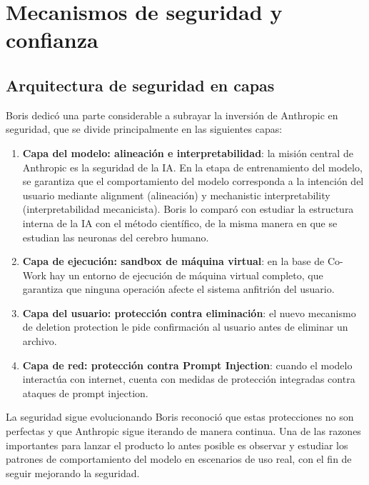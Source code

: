 \section{Mecanismos de seguridad y confianza}

\subsection{Arquitectura de seguridad en capas}

Boris dedicó una parte considerable a subrayar la inversión de Anthropic en seguridad, que se divide principalmente en las siguientes capas:

\begin{enumerate}
    \item \textbf{Capa del modelo: alineación e interpretabilidad}: la misión central de Anthropic es la seguridad de la IA. En la etapa de entrenamiento del modelo, se garantiza que el comportamiento del modelo corresponda a la intención del usuario mediante alignment (alineación) y mechanistic interpretability (interpretabilidad mecanicista). Boris lo comparó con estudiar la estructura interna de la IA con el método científico, de la misma manera en que se estudian las neuronas del cerebro humano.

    \item \textbf{Capa de ejecución: sandbox de máquina virtual}: en la base de Co-Work hay un entorno de ejecución de máquina virtual completo, que garantiza que ninguna operación afecte el sistema anfitrión del usuario.

    \item \textbf{Capa del usuario: protección contra eliminación}: el nuevo mecanismo de deletion protection le pide confirmación al usuario antes de eliminar un archivo.

    \item \textbf{Capa de red: protección contra Prompt Injection}: cuando el modelo interactúa con internet, cuenta con medidas de protección integradas contra ataques de prompt injection.
\end{enumerate}

\begin{warningbox}{La seguridad sigue evolucionando}
Boris reconoció que estas protecciones no son perfectas y que Anthropic sigue iterando de manera continua. Una de las razones importantes para lanzar el producto lo antes posible es observar y estudiar los patrones de comportamiento del modelo en escenarios de uso real, con el fin de seguir mejorando la seguridad.
\end{warningbox}

